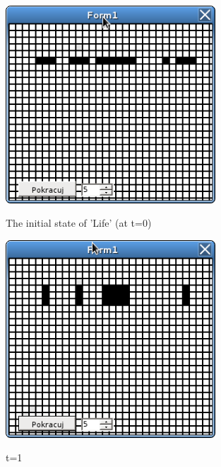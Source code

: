 \begin{figure}[htbp]
 \centering
 \includegraphics[width=0.7\textwidth]{./img/gol1}
 \label{gol1}
 \caption{The initial state of 'Life' (at t=0)}
\end{figure}



\begin{figure}
 \centering
 \includegraphics[width=0.7\textwidth]{./img/gol2}
 \label{gol2}
 \caption{t=1}
\end{figure}

